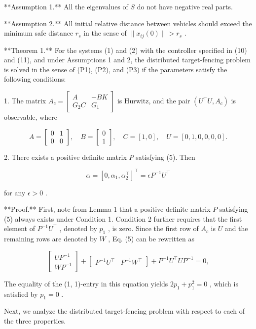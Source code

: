 **Assumption 1.** All the eigenvalues of  $S$  do not have negative real parts.

**Assumption 2.** All initial relative distance between vehicles should exceed the minimum safe distance  $r_s$  in the sense of  $\|x_{ij}(0)\| > r_s$ .

**Theorem 1.** For the systems (1) and (2) with the controller specified in (10) and (11), and under Assumptions 1 and 2, the distributed target-fencing problem is solved in the sense of (P1), (P2), and (P3) if the parameters satisfy the following conditions:

1. The matrix  $A_c = \begin{bmatrix} A & -BK \\ G_2C & G_1 \end{bmatrix}$  is Hurwitz, and the pair  $(U^\top U, A_c)$  is observable, where

$$A = \begin{bmatrix} 0 & 1 \\ 0 & 0 \end{bmatrix}, \quad B = \begin{bmatrix} 0 \\ 1 \end{bmatrix}, \quad C = [1, 0], \quad U = [0, 1, 0, 0, 0, 0].$$

2. There exists a positive definite matrix  $P$  satisfying (5). Then

$$\alpha = [0, \alpha_1, \alpha_2^\top]^\top = \epsilon P^{-1} U^\top$$

for any  $\epsilon > 0$ .

**Proof.** First, note from Lemma 1 that a positive definite matrix  $P$  satisfying (5) always exists under Condition 1. Condition 2 further requires that the first element of  $P^{-1}U^\top$ , denoted by  $p_1$ , is zero. Since the first row of  $A_c$  is  $U$  and the remaining rows are denoted by  $W$ , Eq. (5) can be rewritten as

$$\begin{bmatrix} U P^{-1} \\ W P^{-1} \end{bmatrix} + \begin{bmatrix} P^{-1} U^\top & P^{-1} W^\top \end{bmatrix} + P^{-1} U^\top U P^{-1} = 0,$$

The equality of the (1, 1)-entry in this equation yields  $2p_1 + p_1^2 = 0$ , which is satisfied by  $p_1 = 0$ .

Next, we analyze the distributed target-fencing problem with respect to each of the three properties.

